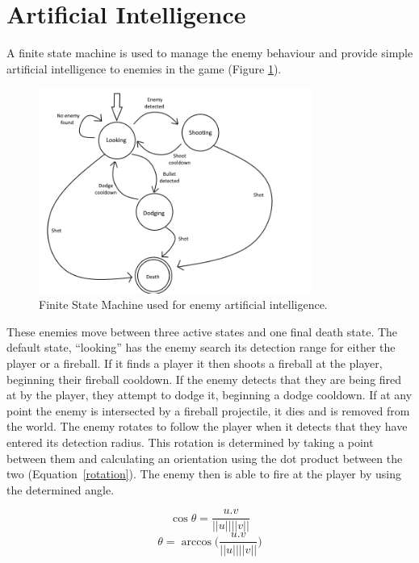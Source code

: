 \documentclass[a4paper, oneside, 11pt]{report}
\begin{document}
\section{Artificial Intelligence}
A finite state machine is used to manage the enemy behaviour and provide simple artificial intelligence to enemies in the game (Figure \ref{fig:fsm}).
\begin{figure}[ht]
\centering
\includegraphics[width=0.8\textwidth]{fsm.png}
\caption{Finite State Machine used for enemy artificial intelligence.}
\label{fig:fsm}
\end{figure}
These enemies move between three active states and one final death state. The default state, ``looking'' has the enemy search its detection range for either the player or a fireball. If it finds a player it then shoots a fireball at the player, beginning their fireball cooldown. If the enemy detects that they are being fired at by the player, they attempt to dodge it, beginning a dodge cooldown. If at any point the enemy is intersected by a fireball projectile, it dies and is removed from the world.       
The enemy rotates to follow the player when it detects that they have entered its detection radius. This rotation is determined by taking a point between them and calculating an orientation using the dot product between the two (Equation~\ref{rotation}). The enemy then is able to fire at the player by using the determined angle.

\begin{equation}
    \cos \theta =\frac{u . v}{||u|| ||v||}\label{rotation}
\end{equation}
\begin{equation}
    \theta = \arccos \Big(\frac{ u . v }{ ||u|| ||v||}\Big)
\end{equation}
\end{document}
